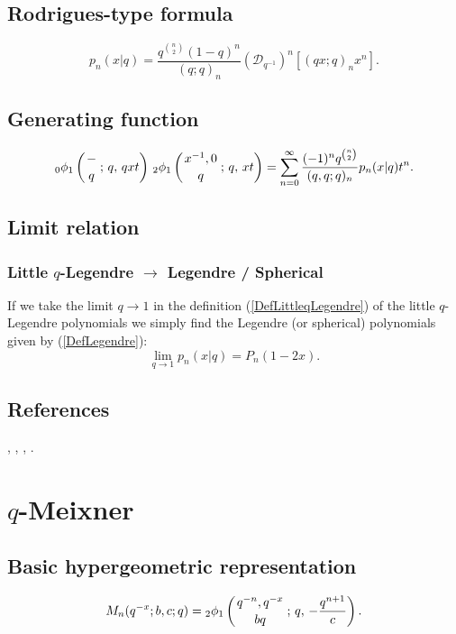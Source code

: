 \documentclass[envcountchap,graybox]{svmono}
\newcommand{\qhyp}[5]{\mbox{}_{#1}{\phi}_{#2}
\left(\genfrac{}{}{0pt}{}{#3}{#4}\,;\,q,\,#5\right)}
\begin{document}
\subsection*{Rodrigues-type formula}
\begin{equation}
\label{RodLittleqLegendre}
p_n(x|q)=\frac{q^{\binom{n}{2}}(1-q)^n}{(q;q)_n}
\left(\mathcal{D}_{q^{-1}}\right)^n\left[(qx;q)_nx^n\right].
\end{equation}

\subsection*{Generating function}
\begin{equation}
\label{GenLittleqLegendre}
\qhyp{0}{1}{-}{q}{qxt}\,\qhyp{2}{1}{x^{-1},0}{q}{xt}=\sum_{n=0}^{\infty}
\frac{(-1)^nq^{\binom{n}{2}}}{(q,q;q)_n}p_n(x|q)t^n.
\end{equation}

\subsection*{Limit relation}

\subsubsection*{Little $q$-Legendre $\rightarrow$ Legendre / Spherical}
If we take the limit $q\rightarrow 1$ in the definition
(\ref{DefLittleqLegendre}) of the little $q$-Legendre polynomials we simply
find the Legendre (or spherical) polynomials given by (\ref{DefLegendre}):
\begin{equation}
\lim_{q\rightarrow 1}p_n(x|q)=P_n(1-2x).
\end{equation}

\subsection*{References}
\cite{Koorn90II}, \cite{Koorn91}, \cite{Rahman89}, \cite{VanAsscheKoorn}.


\section{$q$-Meixner}
\par\setcounter{equation}{0}

\subsection*{Basic hypergeometric representation}
\begin{equation}
\label{DefqMeixner}
M_n(q^{-x};b,c;q)=\qhyp{2}{1}{q^{-n},q^{-x}}{bq}{-\frac{q^{n+1}}{c}}.
\end{equation}
\end{document}
